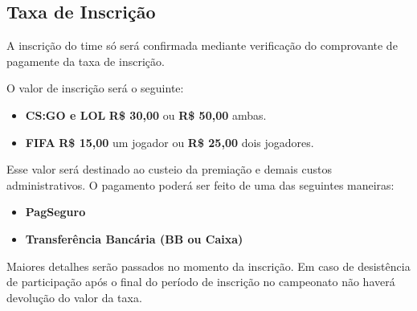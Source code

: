 \subsection{Taxa de Inscrição}

A inscrição do time só será confirmada mediante verificação do comprovante de pagamente da taxa de inscrição.

O valor de inscrição será o seguinte:

\begin{itemize}
	\item \textbf{CS:GO e LOL} \textbf{R\$ 30,00} ou \textbf{R\$ 50,00} ambas.
	\item \textbf{FIFA} \textbf{R\$ 15,00} um jogador ou \textbf{R\$ 25,00} dois jogadores.
\end{itemize}

Esse valor será destinado ao custeio da premiação e demais custos administrativos. O pagamento poderá ser feito de uma das seguintes maneiras:

\begin{itemize}
	\item \textbf{PagSeguro}
	\item \textbf{Transferência Bancária (BB ou Caixa)}
\end{itemize}

Maiores detalhes serão passados no momento da inscrição. Em caso de desistência de participação após o final do período de inscrição no campeonato não haverá devolução do valor da taxa.
